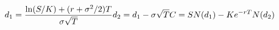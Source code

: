 \documentclass[preview]{standalone}
\begin{document}
\begin{align*}
\special{dvisvgm:raw <g id='unique000'>}d_1 = \frac{\ln(S/K)+(r+\sigma^2/2)T}{\sigma\sqrt{T}} \special{dvisvgm:raw </g>}\special{dvisvgm:raw <g id='unique001'>}d_2 = d_1 - \sigma\sqrt{T} \special{dvisvgm:raw </g>}\special{dvisvgm:raw <g id='unique002'>}C = S N(d_1) - Ke^{-rT}N(d_2)\special{dvisvgm:raw </g>}
\end{align*}
\end{document}
